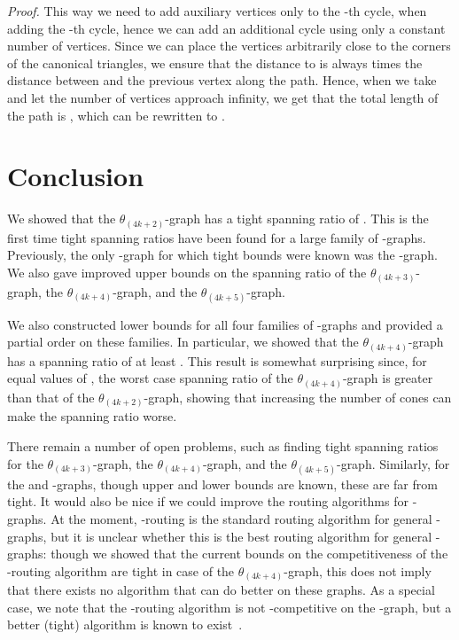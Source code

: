 \documentclass[12pt]{article}
\newenvironment{proof}{\emph{Proof.}}{\hfill \\}
\newcommand{\graph}[1]{\ensuremath{\theta_{(4 k + #1)}}-graph\xspace}
\begin{document}
\begin{proof}
  This way we need to add auxiliary vertices only to the -th cycle, when adding the -th cycle, hence we can add an additional cycle using only a constant number of vertices. Since we can place the vertices arbitrarily close to the corners of the canonical triangles, we ensure that the distance to  is always  times the distance between  and the previous vertex along the path. Hence, when we take  and let the number of vertices approach infinity, we get that the total length of the path is , which can be rewritten to .
\end{proof}


\section{Conclusion}
We showed that the \graph{2} has a tight spanning ratio of . This is the first time tight spanning ratios have been found for a large family of -graphs. Previously, the only -graph for which tight bounds were known was the -graph. We also gave improved upper bounds on the spanning ratio of the \graph{3}, the \graph{4}, and the \graph{5}. 

We also constructed lower bounds for all four families of -graphs and provided a partial order on these families. In particular, we showed that the \graph{4} has a spanning ratio of at least . This result is somewhat surprising since, for equal values of , the worst case spanning ratio of the \graph{4} is greater than that of the \graph{2}, showing that increasing the number of cones can make the spanning ratio worse. 

There remain a number of open problems, such as finding tight spanning ratios for the \graph{3}, the \graph{4}, and the \graph{5}. Similarly, for the  and -graphs, though upper and lower bounds are known, these are far from tight. It would also be nice if we could improve the routing algorithms for -graphs. At the moment, -routing is the standard routing algorithm for general -graphs, but it is unclear whether this is the best routing algorithm for general -graphs: though we showed that the current bounds on the competitiveness of the -routing algorithm are tight in case of the \graph{4}, this does not imply that there exists no algorithm that can do better on these graphs. As a special case, we note that the -routing algorithm is not -competitive on the -graph, but a better (tight) algorithm is known to exist~\cite{BFRV12}. 




\end{document}
